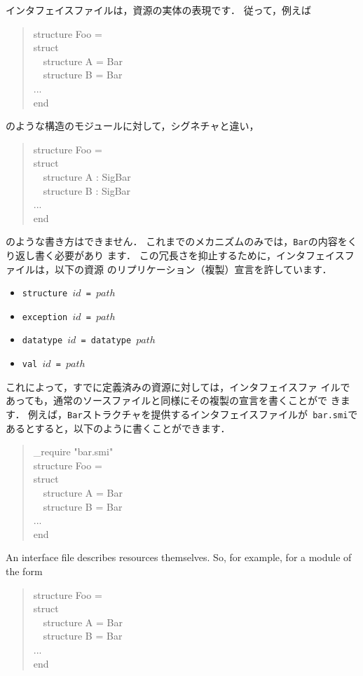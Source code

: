 \documentclass{jbook}
\newcommand{\myem}{\mbox{\ \ }}
\newenvironment{program}{\begin{quote}\begin{tt}}%
                        {\end{tt}\end{quote}}
\begin{document}
\ifjp%
	インタフェイスファイルは，資源の実体の表現です．
	従って，例えば
\begin{program}
structure Foo = \\
struct\\
\myem structure A = Bar\\
\myem structure B = Bar\\
...\\
end

\end{program}
のような構造のモジュールに対して，シグネチャと違い，
\begin{program}
structure Foo = \\
struct\\
\myem structure A : SigBar\\
\myem structure B : SigBar\\
...\\
end
\end{program}
のような書き方はできません．
	これまでのメカニズムのみでは，{\tt Bar}の内容をくり返し書く必要があり
ます．
	この冗長さを抑止するために，インタフェイスファイルは，以下の資源
のリプリケーション（複製）宣言を許しています．
\begin{itemize}
\item {\tt structure $id$ =  $path$}
\item {\tt exception $id$ = $path$}
\item {\tt datatype $id$ = datatype $path$}
\item {\tt val $id$ = $path$}
\end{itemize}
	これによって，すでに定義済みの資源に対しては，インタフェイスファ
イルであっても，通常のソースファイルと同様にその複製の宣言を書くことがで
きます．
	例えば，{\tt Bar}ストラクチャを提供するインタフェイスファイルが{\tt
bar.smi}であるとすると，以下のように書くことができます．
\begin{program}
\_require "bar.smi"\\
structure Foo = \\
struct\\
\myem structure A = Bar\\
\myem structure B = Bar\\
...\\
end
\end{program}
\else%
	An interface file describes resources themselves.
	So, for example, for a module of the form
\begin{program}
structure Foo = \\
struct\\
\myem structure A = Bar\\
\myem structure B = Bar\\
...\\
end

\end{program}
\end{document}
